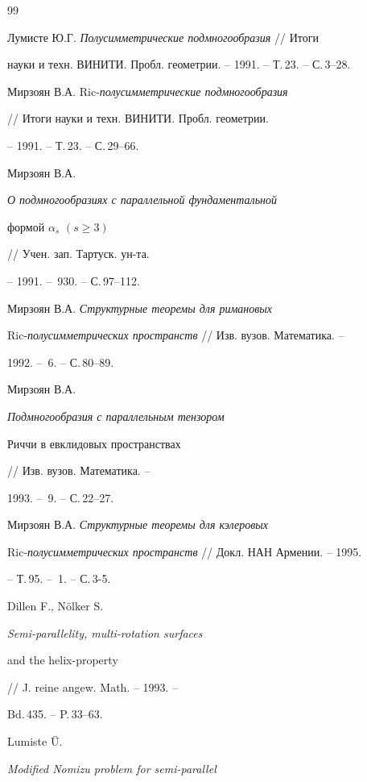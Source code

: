\begin{thebibliography}{99}







Лумисте Ю.Г. {\em Полусимметрические подмногообразия} // Итоги


науки и техн. ВИНИТИ. Пробл. геометрии. -- 1991. -- Т.\,23. -- С.\,3--28.




Мирзоян В.А. Ric-{\em полусимметрические подмногообразия}


// Итоги науки и техн. ВИНИТИ. Пробл. геометрии.


-- 1991. -- Т.\,23. -- С.\,29--66.




Мирзоян В.А. {\em О подмногообразиях с параллельной фундаментальной


формой $\alpha_s$ $(s\ge 3)$} // Учен. зап. Тартуск. ун-та.


-- 1991. -- \No\,930. -- С.\,97--112.




Мирзоян В.А. {\em Структурные теоремы для римановых}


Ric-{\em полусимметрических пространств} // Изв. вузов. Математика. --


1992. -- \No\,6. -- С.\,80--89.




Мирзоян В.А. {\em Подмногообразия с параллельным тензором


Риччи в евклидовых пространствах} // Изв. вузов. Математика. --


1993. -- \No\,9. -- С.\,22--27.




Мирзоян В.А. {\em Структурные теоремы для кэлеровых}


Ric-{\em полусимметрических пространств} // Докл. НАН Армении. -- 1995.


-- Т.\,95. -- \No\,1. -- С.\,3-5.




Dillen F., N\"olker S. {\em Semi-parallelity, multi-rotation surfaces


and the helix-property} // J. reine angew. Math. -- 1993. --


Bd.\,435. -- P.\,33--63.




Lumiste \"U. {\em Modified Nomizu problem for semi-parallel


}
\end{thebibliography}
